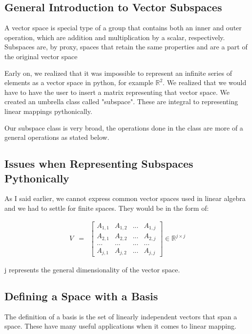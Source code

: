 \documentclass[12pt, a4paper]{article}
\begin{document}
\subsection{General Introduction to Vector Subspaces}

A vector space is special type of a group that contains both an inner and outer
operation, which are addition and multiplication by a scalar, respectively. Subspaces are, by proxy, spaces that retain the same properties and are a part of the original vector space

Early on, we realized that it was impossible to represent an infinite series of elements as a vector space in python, for example $\mathbb{R}^{2}$. 
We realized that we would have to have the user to insert a matrix representing that vector space. We created an umbrella class called "subspace".
These are integral to representing linear mappings pythonically.

Our subspace class is very broad, the operations done in the class are more of a general operations as stated below.

\subsection{Issues when Representing Subspaces Pythonically}

As I said earlier, we cannot express common vector spaces used in linear algebra and we had to settle for finite spaces. They would be in the form of:

\begin{eqnarray*}
    V & = &\begin{bmatrix}
        A_{1,1}  & A_{1,2} & ... & A_{1,j}\\
        A_{2,1} & A_{2,2} & ... & A_{2,j}\\
        ... & ... & ... & ... \\
        A_{j,1} & A_{j,2} & ... & A_{j,j}
    \end{bmatrix}
    \in \mathbb{R}^{j \times j}
\end{eqnarray*}

j represents the general dimensionality of the vector space. 

\subsection{Defining a Space with a Basis}

The definition of a basis is the set of linearly independent vectors that span a space. 
These have many useful applications when it comes to linear mapping. 
\end{document}
